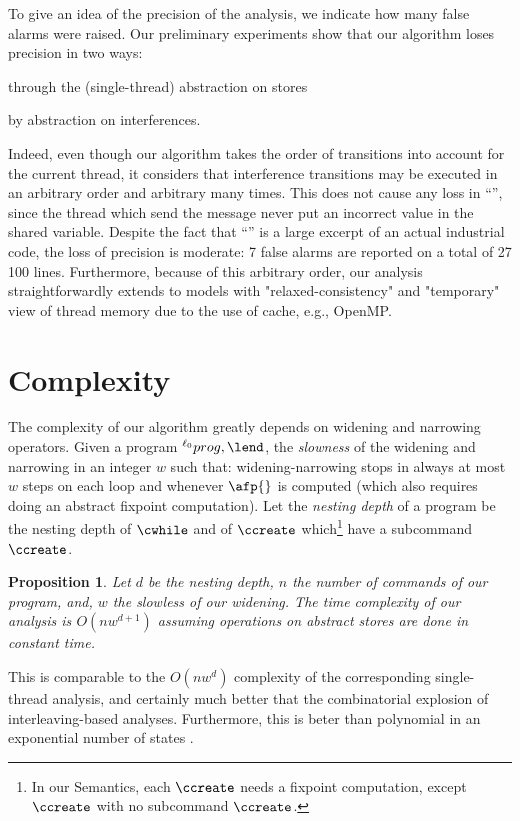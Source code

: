 \documentclass[12pt]{article}
\newcommand{\li}[1]{ {}^{\ell_{#1}}  }
\newtheorem{proposition}{Proposition}
\begin{document}
To give an idea of the precision of the analysis, we indicate how many false alarms were raised. Our preliminary experiments show that our algorithm loses precision in two ways:
\begin{inparaenum}
 \item through the (single-thread) abstraction on stores
 \item by abstraction on interferences.
\end{inparaenum} 
 Indeed, even though our algorithm takes the order of transitions into account for the current thread, it considers that interference transitions may be executed in an arbitrary order and arbitrary many times. This does not cause any loss in ``\messag'', since the thread which send the message never put an incorrect value in the shared variable. Despite the fact that ``\embarque'' is a large excerpt of an actual industrial code, the loss of precision is moderate: 7 false alarms are reported on a total of 27 100 lines.
Furthermore, because of this arbitrary order, our analysis straightforwardly extends to models with "relaxed-consistency" and "temporary" view of thread memory due to the use of cache, e.g., OpenMP.

\section{Complexity}\label{section:complexity}
The complexity of our algorithm greatly depends on widening and narrowing operators. Given a program \(\li0prog,\lend\), the \emph{slowness} of the widening and narrowing in an integer \(w\) such that:
widening-narrowing stops in always at most \(w\) steps on each loop and whenever \(\afp{}\) is computed (which also requires doing an abstract fixpoint computation).
 Let the \emph{nesting depth} of a program be the nesting depth of \(\cwhile\) and of \(\ccreate\) which\footnote{In our Semantics, each \(\ccreate\) needs a fixpoint computation, except \(\ccreate\) with no subcommand \(\ccreate\).} have a subcommand \(\ccreate\).
 
\begin{proposition}\label{prop:complexity}
Let \(d\) be the nesting depth, \(n\) the number of commands of our program, and, \(w\) the slowless of our widening. The time complexity of our analysis is \(O(n w^{d+1})\) assuming operations on  abstract stores are done in constant time.
\end{proposition}

This is comparable to the \(O(n w^{d})\) complexity of the corresponding single-thread analysis, and certainly much better that the combinatorial explosion of interleaving-based analyses. Furthermore, this is beter than polynomial in an exponential number of states \cite{DBLP:conf/spin/FlanaganQ03}.
\end{document}
